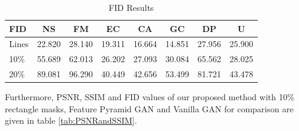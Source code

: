 \begin{table}[h!]
\centering
\begin{tabular}{@{}l|c|c|c|c|c|c|l@{}}
\textbf{FID} & \multicolumn{1}{c}{NS} & \multicolumn{1}{c}{FM} & \multicolumn{1}{c}{EC} & \multicolumn{1}{c}{CA} & \multicolumn{1}{c}{GC} & \multicolumn{1}{c}{DP} & \multicolumn{1}{c}{U}     \\ \midrule
Lines         & 22.820                  & 28.140           & 19.311                   & 16.664                    & 14.851                  & 27.956                     & 25.900 \\ \cmidrule(l){2-8} 
10\%          & 55.689                 & 62.013            & 26.202                   & 27.093                   & 30.084                 & 65.562                     & 28.025 \\ \cmidrule(l){2-8} 
20\%          & 89.081                 & 96.290                    & 40.449                   & 42.656                   & 53.499                 & 81.721                     & 43.478 \\ \bottomrule
\end{tabular}
\caption{FID Results}
\label{tab:FIDresults}
\end{table}

Furthermore, PSNR, SSIM and FID values of our proposed method with 10\% rectangle masks, Feature Pyramid GAN and Vanilla GAN for comparison are given in table \ref{tab:PSNRandSSIM}.
\vspace*{3mm}

\begin{table}[!h]
\centering
{}
\vspace*{2mm}
\caption{SSIM, PSNR and FID results for proposed methods}
\label{tab:PSNRandSSIM}
\end{table}